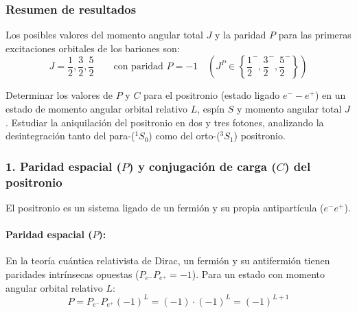 \begin{problema}
\subsubsection*{Resumen de resultados}

Los posibles valores del momento angular total $J$ y la paridad $P$ para las primeras excitaciones orbitales de los bariones son:
\begin{equation*}
J = \frac{1}{2}, \frac{3}{2}, \frac{5}{2} \qquad \text{con paridad } P = -1 \quad \left( J^P \in \left\{ \frac{1}{2}^-, \frac{3}{2}^-, \frac{5}{2}^- \right\} \right)
\end{equation*}
\end{problema}
\newpage
\begin{problema}
Determinar los valores de $P$ y $C$ para el positronio (estado ligado $e^- - e^+$) en un estado de momento angular orbital relativo $L$, espín $S$ y momento angular total $J$. Estudiar la aniquilación del positronio en dos y tres fotones, analizando la desintegración tanto del para-($^1S_0$) como del orto-($^3S_1$) positronio.

\tcblower

\subsubsection*{1. Paridad espacial ($P$) y conjugación de carga ($C$) del positronio}

El positronio es un sistema ligado de un fermión y su propia antipartícula ($e^- e^+$).

\paragraph{Paridad espacial ($P$):}
En la teoría cuántica relativista de Dirac, un fermión y su antifermión tienen paridades intrínsecas opuestas ($P_{e^-} P_{e^+} = -1$). Para un estado con momento angular orbital relativo $L$:
\begin{equation*}
P = P_{e^-} P_{e^+} (-1)^L = (-1) \cdot (-1)^L = (-1)^{L+1}
\end{equation*}


\end{problema}
